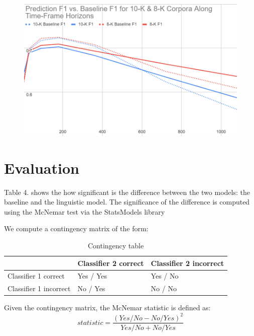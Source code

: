 \documentclass[11pt,a4paper]{article}
\begin{document}
\begin{figure}[h]
\begin{adjustwidth}{-0.5in}{0in}
\caption{}
\includegraphics[scale=0.275]{f1_figure}
\end{adjustwidth}
\end{figure}

\section{Evaluation}

Table 4. shows the how significant is the difference between the two models: the baseline and the linguistic model. The significance of the difference is computed using the McNemar test via the StatsModels library \cite{seabold2010statsmodels} 

We compute a contingency matrix of the form:
\begin{table}[h!]
\begin{adjustwidth}{0in}{0in}
\begin{tabular}{ |p{2cm}| p{2cm} | p{2cm}|  }
 \hline
 & Classifier 2 correct & Classifier 2 incorrect\\
 \hline
Classifier 1 correct   & Yes / Yes & Yes / No\\
\hline
Classifier 1 incorrect & No / Yes  & No / No \\
 \hline
\end{tabular}
\caption{Contingency table}
\end{adjustwidth}
\label{table:3}
\end{table}


Given the contingency matrix, the McNemar statistic is defined as:
\[ statistic = \frac{(Yes/No - No/Yes)^2}{Yes/No + No/Yes} \]
\end{document}

